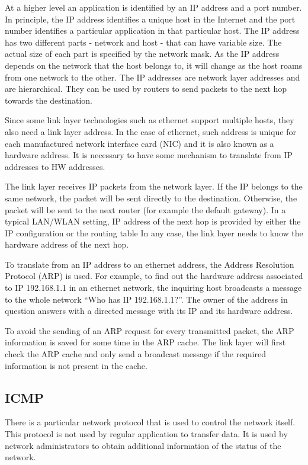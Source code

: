 At a higher level an application is identified by an IP address and a port number. 
In principle, the IP address identifies a unique host in the Internet and the port number identifies a particular application in that particular host.
The IP address has two different parts - network and host -  that can have variable size.
The actual size of each part is specified by the network mask.
As the IP address depends on the network that the host belongs to, it will change as the host roams from one network to the other.
The IP addresses are network layer addresses and are hierarchical.
They can be used by routers to send packets to the next hop towards the destination.

Since some link layer technologies such as ethernet support multiple hosts, they also need a link layer address.
In the case of ethernet, such address is unique for each manufactured network interface card (NIC) and it is also known as a hardware address.
It is necessary to have some mechanism to translate from IP addresses to HW addresses.

The link layer receives IP packets from the network layer.
If the IP belongs to the same network, the packet will be sent directly to the destination.
Otherwise, the packet will be sent to the next router (for example the default gateway).
In a typical LAN/WLAN setting,  IP address of the next hop is provided by either the IP configuration or the routing table
In any case, the link layer needs to know the hardware address of the next hop.

To translate from an IP address to an ethernet address, the Address Resolution Protocol (ARP) is used.
For example, to find out the hardware address associated to IP 192.168.1.1 in an ethernet network, the inquiring host broadcasts a message to the whole network ``Who has IP 192.168.1.1?''.
The owner of the address in question answers with a directed message with its IP and its hardware address.

To avoid the sending of an ARP request for every transmitted packet, the ARP information is saved for some time in the ARP cache.
The link layer will first check the ARP cache and only send a broadcast message if the required information is not present in the cache.


\subsection{ICMP}

There is a particular network protocol that is used to control the network itself.
This protocol is not used by regular application to transfer data. 
It is used by network administrators to obtain additional information of the status of the network.

